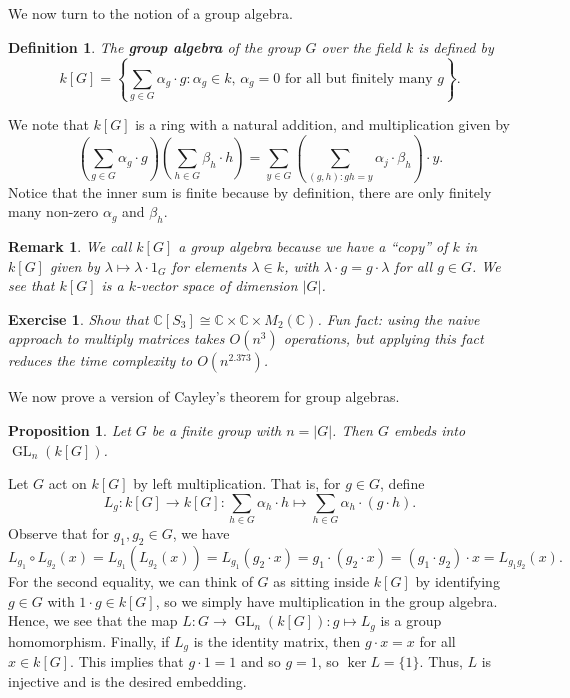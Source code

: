 \documentclass[10pt]{article}
\makeatletter
\numberwithin{equation}{section}
\newcommand{\C}{\mathbb{C}}
\DeclareMathOperator{\GL}{GL}
\theoremstyle{newstyle}
\newtheorem{remark}[thm]{Remark}
\newtheorem{prop}[thm]{Proposition}
\newtheorem{defn}[thm]{Definition}
\newtheorem{exercise}[thm]{Exercise}
\newenvironment{pf}[1][\proofname]{\par
  \pushQED{\qed}%
  \normalfont \topsep0\p@\relax
  \trivlist
  \item[\hskip\labelsep\scshape
  #1\@addpunct{.}]\ignorespaces
}{%
  \popQED\endtrivlist\@endpefalse
}
\makeatother
\begin{document}
We now turn to the notion of a group algebra.

\begin{defn}
The {\bf group algebra} of the group $G$ over the field $k$ is defined by 
\[ k[G] = \left\{ \sum_{g\in G} \alpha_g \cdot g : \alpha_g \in k,\, \alpha_g = 0 \text{ for all but 
finitely many $g$} \right\}. \]
\end{defn}

We note that $k[G]$ is a ring with a natural addition, and multiplication given by 
\[ \left( \sum_{g\in G} \alpha_g \cdot g \right) \left( \sum_{h \in G} \beta_h \cdot h \right) 
= \sum_{y \in G} \left( \sum_{(g, h) : gh = y} \alpha_j \cdot \beta_h \right) \cdot y. \]
Notice that the inner sum is finite because by definition, there are only finitely many 
non-zero $\alpha_g$ and $\beta_h$. 

\begin{remark}
We call $k[G]$ a group {\it algebra} because we have a ``copy'' of $k$ in $k[G]$ given by 
$\lambda \mapsto \lambda \cdot 1_G$ for elements $\lambda \in k$, with $\lambda \cdot g = g 
\cdot \lambda$ for all $g \in G$. We see that $k[G]$ is a $k$-vector space of dimension $|G|$. 
\end{remark}

\begin{exercise}
Show that $\C[S_3] \cong \C \times \C \times M_2(\C)$. Fun fact: using the naive approach 
to multiply matrices takes $O(n^3)$ operations, but applying this fact reduces the time complexity to 
$O(n^{2.373})$. 
\end{exercise}

We now prove a version of Cayley's theorem for group algebras. 

\begin{prop}
Let $G$ be a finite group with $n = |G|$. Then $G$ embeds into $\GL_n(k[G])$. 
\end{prop}
\begin{pf}
Let $G$ act on $k[G]$ by left multiplication. That is, for $g \in G$, define 
\[ L_g : k[G] \to k[G] : \sum_{h\in G} \alpha_h \cdot h \mapsto \sum_{h\in G} \alpha_h \cdot (g \cdot h). \]
Observe that for $g_1, g_2 \in G$, we have 
\[ L_{g_1} \circ L_{g_2}(x) = L_{g_1}(L_{g_2}(x)) = L_{g_1}(g_2 \cdot x) = g_1 \cdot (g_2 \cdot x)
= (g_1 \cdot g_2) \cdot x = L_{g_1g_2}(x). \] 
For the second equality, we can think of $G$ as sitting inside $k[G]$ by identifying 
$g \in G$ with $1 \cdot g \in k[G]$, so we simply have multiplication in the group algebra. 
Hence, we see that the map $L : G \to \GL_n(k[G]) : g \mapsto L_g$ is a group homomorphism. Finally, if 
$L_g$ is the identity matrix, then $g \cdot x = x$ for all $x \in k[G]$. This implies that 
$g \cdot 1 = 1$ and so $g = 1$, so $\ker L = \{1\}$. Thus, $L$ is injective and is the desired embedding.
\end{pf}
\end{document}
